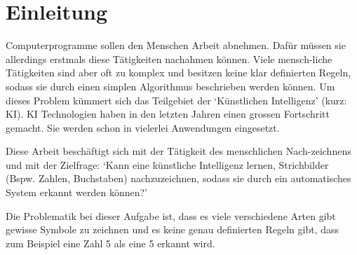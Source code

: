 \chapter{Einleitung}







Computerprogramme sollen den Menschen Arbeit abnehmen. Dafür müssen sie
allerdings erstmals diese Tätigkeiten nachahmen können. Viele mensch\hyp{}liche
Tätigkeiten sind aber oft zu komplex und besitzen keine klar definierten Regeln,
sodass sie durch einen simplen Algorithmus beschrieben werden können. Um dieses
Problem kümmert sich das Teilgebiet der `Künstlichen Intelligenz' (kurz: KI). KI
Technologien haben in den letzten Jahren einen grossen Fortschritt gemacht. Sie
werden schon in vielerlei Anwendungen eingesetzt.

Diese Arbeit beschäftigt sich mit der Tätigkeit des menschlichen Nach\hyp{}zeichnens
und mit der Zielfrage: `Kann eine künstliche Intelligenz lernen, Strichbilder
(Bspw. Zahlen, Buchstaben) nachzuzeichnen, sodass sie durch ein automatisches
System erkannt werden können?'

Die Problematik bei dieser Aufgabe ist, dass es viele verschiedene Arten gibt
gewisse Symbole zu zeichnen und es keine genau definierten Regeln gibt, dass zum
Beispiel eine Zahl 5 als eine 5 erkannt wird.

